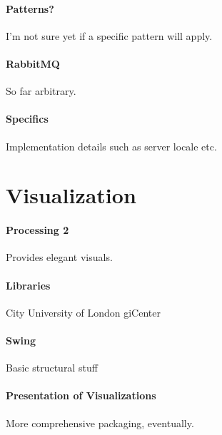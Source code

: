 \paragraph{Patterns?}
I'm not sure yet if a specific pattern will apply.

\paragraph{RabbitMQ}
So far arbitrary.

\paragraph{Specifics}
Implementation details such as server locale etc.

\section{Visualization}
\label{visualization}
\paragraph{Processing 2}
Provides elegant visuals.

\paragraph{Libraries}
City University of London giCenter

\paragraph{Swing}
Basic structural stuff

\paragraph{Presentation of Visualizations}
More comprehensive packaging, eventually.

